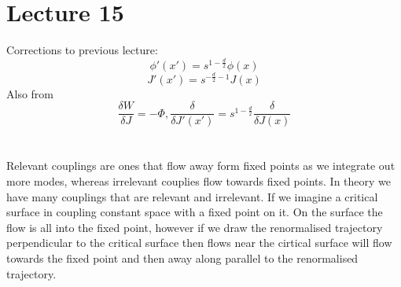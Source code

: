 \documentclass{article}
\begin{document}
 \section{Lecture 15}
 Corrections to previous lecture:
 $$
 \phi'(x') = s^{1 - \frac{d}{2}} \phi(x)
 $$
 $$
J'(x')= s^{- \frac{d}{2} -1} J(x)
 $$
 Also from 
 $$
  \frac{\delta W}{\delta J} = - \Phi, \frac{\delta}{\delta J'(x')} = s^{1-\frac{d}{2}} \frac{\delta }{\delta J(x)}
 $$
\\\\
Relevant couplings are ones that flow away form fixed points as we integrate out more modes, whereas irrelevant couplies flow towards fixed points. In theory we have many couplings that are relevant and irrelevant. If we imagine a critical surface in coupling constant space with a fixed point on it. On the surface the flow is all into the fixed point, however if we draw the renormalised trajectory perpendicular to the critical surface then flows near the cirtical surface will flow towards the fixed point and then away along parallel to the renormalised trajectory. 
\end{document}
